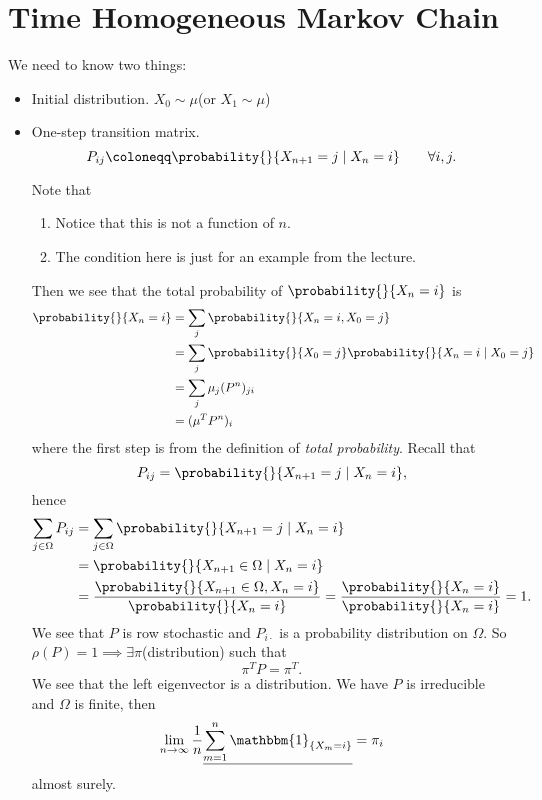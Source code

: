\section{Time Homogeneous Markov Chain}
We need to know two things:
\begin{itemize}
	\item Initial distribution. \(X_0 \sim \mu\)(or \(X_1\sim \mu\))
	\item One-step transition matrix.
	      \[
		      P_{ij} \coloneqq \probability{}{X_{n+1} = j \mid X_n = i}\qquad \forall i, j.
	      \]


	      \begin{note}
		      Note that
		      \begin{enumerate}
			      \item Notice that this is not a function of \(n\).
			      \item The condition here is just for an example from the lecture.
		      \end{enumerate}
	      \end{note}

	      Then we see that the total probability of \(\probability{}{X_n = i}\) is
	      \[
		      \begin{split}
			      \probability{}{X_n = i} &= \sum_j \probability{}{X_n = i, X_0 = j}\\
			      &= \sum_j \probability{}{X_0 = j}\probability{}{X_n = i  \mid  X_0 = j}\\
			      &=\sum_j \mu_{j} (P^n)_{ji}\\
			      &= (\mu^{T} P^n)_i
		      \end{split}
	      \]
	      where the first step is from the definition of \emph{total probability}. Recall that
	      \[
		      P_{ij} = \probability{}{X_{n+1} = j \mid X_n = i},
	      \]
	      hence
	      \[
		      \begin{split}
			      \sum_{j\in \Omega} P_{ij} &= \sum_{j\in \Omega} \probability{}{X_{n+1} = j \mid X_n = i}\\
			      &= \probability{}{X_{n+1}\in \Omega \mid X_n = i}\\
			      &= \frac{\probability{}{X_{n+1}\in \Omega, X_n = i} }{\probability{}{X_n = i} }
			      = \frac{\probability{}{X_n = i} }{\probability{}{X_n = i} }
			      = 1.
		      \end{split}
	      \]
	      We see that \(P\) is row stochastic and \(P_{i\cdot}\) is a probability distribution on \(\Omega\). So \(\rho(P) = 1\implies \exists  \pi\)(distribution) such that
	      \[
		      \pi^{T} P = \pi^{T}.
	      \]
	      We see that the left eigenvector is a distribution. We have \(P\) is irreducible and \(\Omega\) is finite, then
	      \[
		      \lim_{n\to \infty } \frac{1}{n}\underline{\sum\limits_{m=1}^{n}  \mathbbm{1}_{\left\{ X_m = i \right\} }} = \pi_i
	      \]
	      almost surely.
\end{itemize}

